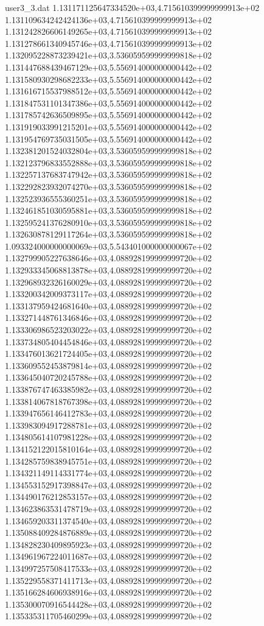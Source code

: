 \begin{filecontents}{user3_3.dat}
1.131171125647334520e+03,4.715610399999999913e+02
1.131109634242424136e+03,4.715610399999999913e+02
1.131242826606149265e+03,4.715610399999999913e+02
1.131278661340945746e+03,4.715610399999999913e+02
1.132095228873239421e+03,3.536059599999999818e+02
1.131447688439467129e+03,5.556914000000000442e+02
1.131580930298682233e+03,5.556914000000000442e+02
1.131616715537988512e+03,5.556914000000000442e+02
1.131847531101347386e+03,5.556914000000000442e+02
1.131785742636509895e+03,5.556914000000000442e+02
1.131919033991215201e+03,5.556914000000000442e+02
1.131954769735031505e+03,5.556914000000000442e+02
1.132381201524032804e+03,3.536059599999999818e+02
1.132123796833552888e+03,3.536059599999999818e+02
1.132257137683747942e+03,3.536059599999999818e+02
1.132292823932074270e+03,3.536059599999999818e+02
1.132523936555360251e+03,3.536059599999999818e+02
1.132461851030595881e+03,3.536059599999999818e+02
1.132595241376280910e+03,3.536059599999999818e+02
1.132630878129117264e+03,3.536059599999999818e+02
1.093324000000000069e+03,5.543401000000000067e+02
1.132799905227638646e+03,4.088928199999999720e+02
1.132933345068813878e+03,4.088928199999999720e+02
1.132968932326160029e+03,4.088928199999999720e+02
1.133200342009373117e+03,4.088928199999999720e+02
1.133137959424681640e+03,4.088928199999999720e+02
1.133271448761346846e+03,4.088928199999999720e+02
1.133306986523203022e+03,4.088928199999999720e+02
1.133734805404454846e+03,4.088928199999999720e+02
1.133476013621724405e+03,4.088928199999999720e+02
1.133609552453879814e+03,4.088928199999999720e+02
1.133645040720245788e+03,4.088928199999999720e+02
1.133876747463385982e+03,4.088928199999999720e+02
1.133814067818767398e+03,4.088928199999999720e+02
1.133947656146412783e+03,4.088928199999999720e+02
1.133983094917288781e+03,4.088928199999999720e+02
1.134805614107981228e+03,4.088928199999999720e+02
1.134152122015810164e+03,4.088928199999999720e+02
1.134285759838945751e+03,4.088928199999999720e+02
1.134321149114331774e+03,4.088928199999999720e+02
1.134553152917398847e+03,4.088928199999999720e+02
1.134490176212853157e+03,4.088928199999999720e+02
1.134623863531478719e+03,4.088928199999999720e+02
1.134659203311374540e+03,4.088928199999999720e+02
1.135088409284876889e+03,4.088928199999999720e+02
1.134828230409895923e+03,4.088928199999999720e+02
1.134961967224011687e+03,4.088928199999999720e+02
1.134997257508417533e+03,4.088928199999999720e+02
1.135229558371411713e+03,4.088928199999999720e+02
1.135166284606938916e+03,4.088928199999999720e+02
1.135300070916544428e+03,4.088928199999999720e+02
1.135335311705460299e+03,4.088928199999999720e+02

\end{filecontents}
